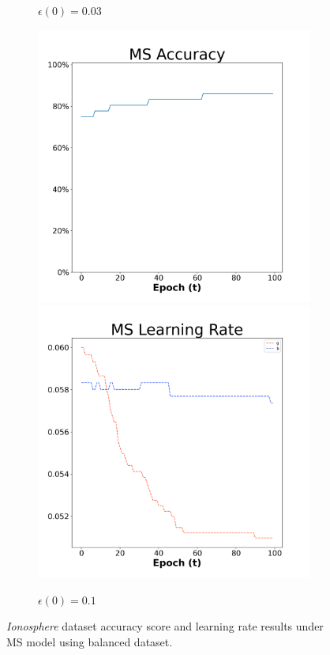 \begin{figure}[H]
\begin{subfigure}{0.3\textwidth}
  \caption{$\epsilon(0)=0.03$}
\end{subfigure}\hfil %
\begin{subfigure}{0.3\textwidth}
  \includegraphics[width=\linewidth]{images/exper1/Ionosphere/MS_0.1_acc.png}
  \includegraphics[width=\linewidth]{images/exper1/Ionosphere/MS_0.1_lr.png}
  \caption{$\epsilon(0)=0.1$}
\end{subfigure}

\caption{\textit{Ionosphere} dataset accuracy score and learning rate results under MS model using balanced dataset.}
\end{figure}


